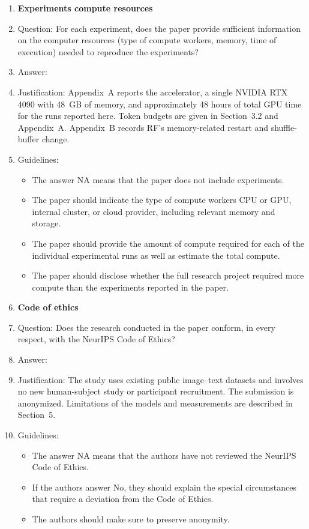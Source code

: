 \begin{enumerate}
\item {\bf Experiments compute resources}
    \item[] Question: For each experiment, does the paper provide sufficient information on the computer resources (type of compute workers, memory, time of execution) needed to reproduce the experiments?
    \item[] Answer: \answerYes{}
    \item[] Justification: Appendix~A reports the accelerator, a single NVIDIA RTX 4090 with 48~GB of memory, and approximately 48 hours of total GPU time for the runs reported here. Token budgets are given in Section~3.2 and Appendix~A. Appendix~B records RF's memory-related restart and shuffle-buffer change.
    \item[] Guidelines:
    \begin{itemize}
        \item The answer NA means that the paper does not include experiments.
        \item The paper should indicate the type of compute workers CPU or GPU, internal cluster, or cloud provider, including relevant memory and storage.
        \item The paper should provide the amount of compute required for each of the individual experimental runs as well as estimate the total compute.
        \item The paper should disclose whether the full research project required more compute than the experiments reported in the paper.
    \end{itemize}

\item {\bf Code of ethics}
    \item[] Question: Does the research conducted in the paper conform, in every respect, with the NeurIPS Code of Ethics?
    \item[] Answer: \answerYes{}
    \item[] Justification: The study uses existing public image--text datasets and involves no new human-subject study or participant recruitment. The submission is anonymized. Limitations of the models and measurements are described in Section~5.
    \item[] Guidelines:
    \begin{itemize}
        \item The answer NA means that the authors have not reviewed the NeurIPS Code of Ethics.
        \item If the authors answer No, they should explain the special circumstances that require a deviation from the Code of Ethics.
        \item The authors should make sure to preserve anonymity.
    \end{itemize}


\end{enumerate}
